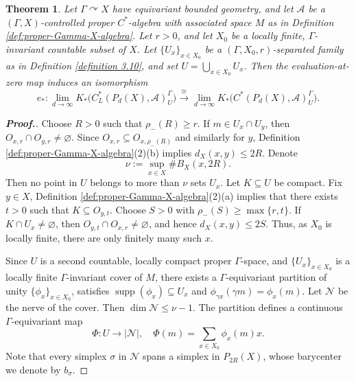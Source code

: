 \documentclass[pdflatex]{sn-jnl}
\theoremstyle{plain}
\newtheorem{theorem}{Theorem}[section]
\theoremstyle{definition}
\begin{document}
\begin{theorem}\label{thm:evaluation-map-isomorphism}
Let $\Gamma\curvearrowright X$ have equivariant bounded geometry, and let $\mathcal{A}$ be a $(\Gamma,X)$-controlled proper $C^{*}$-algebra with associated space $M$ as in
Definition \ref{def:proper-Gamma-X-algebra}. Let $r>0$, and let $X_0$ be a locally finite, $\Gamma$-invariant countable subset of $X$. Let $\{U_x\}_{x\in X_0}$ be a $(\Gamma,X_0,r)$-separated family as in Definition \ref{definition 3.10}, and set
$U=\bigcup_{x\in X_0}U_x$. Then the evaluation-at-zero map induces an isomorphism
\[e_{*}:\lim_{d\to\infty}K_{*}\bigl(
C_L^*(P_{d}(X),\mathcal{A})^\Gamma_U\bigr)
\xrightarrow{\cong}\lim_{d\to\infty}K_{*}\bigl(
C^*(P_{d}(X),\mathcal{A})^\Gamma_U\bigr).\]
\end{theorem}
\begin{proof}[\textbf{Proof.}]\normalsize 
Choose $R>0$ such that $\rho_-(R)\geq r$.
If $m\in U_x\cap U_y$, then
$O_{x,r}\cap O_{y,r}\neq\varnothing$.
Since $O_{x,r}\subseteq O_{x,\rho_-(R)}$ and similarly for $y$, Definition \ref{def:proper-Gamma-X-algebra}(2)(b) implies
$d_X(x,y)\leq 2R$. Denote 
\[\nu:=\sup_{x\in X}\#B_X(x,2R).
\]Then no point in $U$ belongs to more than $\nu$ sets $U_x$. Let $K\subseteq U$
be compact. Fix $y\in X$, Definition \ref{def:proper-Gamma-X-algebra}(2)(a) implies that there exists 
$t>0$ such that
$K\subseteq O_{y,t}$. Choose $S>0$ with
$\rho_-(S)\geq\max\{r,t\}$.
If $K\cap U_x\neq\varnothing$, then
$O_{y,t}\cap O_{x,r}\neq\varnothing$,
and hence $d_X(x,y)\leq2S$. Thus, as $X_0$ is locally finite, there are only finitely many such $x$.

Since $U$ is a second countable, locally compact proper
$\Gamma$-space, and $\{U_x\}_{x\in X_0}$ is a locally finite
$\Gamma$-invariant cover of $M$, there exists a $\Gamma$-equivariant
partition of unity
$\{\phi_x\}_{x\in X_0}$, satisfies 
$\operatorname{supp}(\phi_x)\subseteq U_x$ and 
$\phi_{\gamma x}(\gamma m)=\phi_x(m)$.
Let $\mathcal N$ be the nerve \cite{borsuk1948imbedding} of the cover. Then $\dim\mathcal N\leq\nu-1$.
The partition defines a continuous $\Gamma$-equivariant map
\[\Phi:U\longrightarrow|\mathcal N|,\quad
\Phi(m)=\sum_{x\in X_0}\phi_x(m)x.\]
Note that every simplex $\sigma$ in $\mathcal{N}$ spans a simplex in $P_{2R}(X)$, whose barycenter we denote by $b_\sigma$.


\end{proof}
\end{document}

